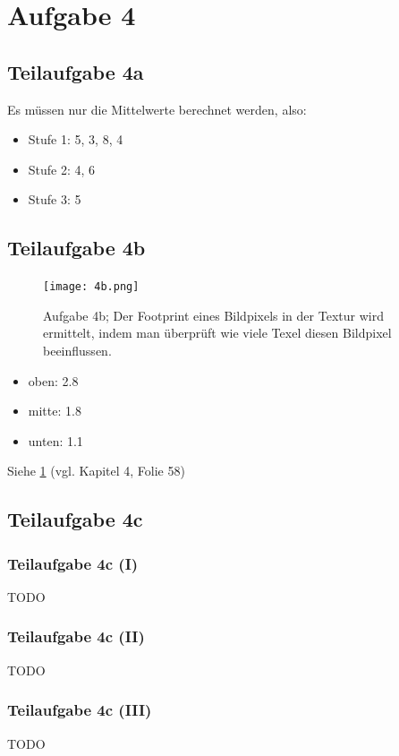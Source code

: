 \documentclass[a4paper]{scrartcl}
\begin{document}
\section*{Aufgabe 4}
\subsection*{Teilaufgabe 4a}

Es müssen nur die Mittelwerte berechnet werden, also:

\begin{itemize}
    \item Stufe 1: 5, 3, 8, 4
    \item Stufe 2: 4, 6
    \item Stufe 3: 5
\end{itemize}

\subsection*{Teilaufgabe 4b}
\begin{figure}[h]
    \centering
    \texttt{[image: 4b.png]}
    \caption{Aufgabe 4b; Der Footprint eines Bildpixels in der Textur wird
             ermittelt, indem man überprüft wie viele Texel diesen Bildpixel
             beeinflussen.}
    \label{fig:4b}
\end{figure}

\begin{itemize}
    \item oben: 2.8
    \item mitte: 1.8
    \item unten: 1.1
\end{itemize}

Siehe \cref{fig:4b} (vgl. Kapitel 4, Folie 58)

\subsection*{Teilaufgabe 4c}
\subsubsection*{Teilaufgabe 4c (I)}
TODO
\subsubsection*{Teilaufgabe 4c (II)}
TODO
\subsubsection*{Teilaufgabe 4c (III)}
TODO
\end{document}
